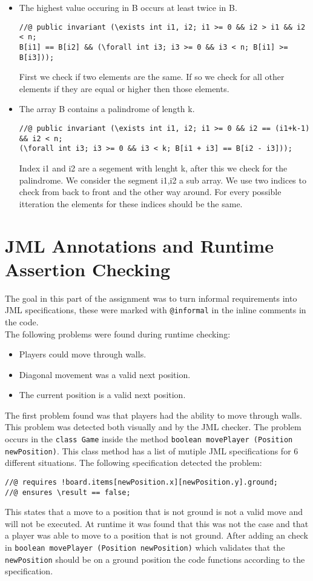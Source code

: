\documentclass[a4paper]{article}
\begin{document}
\begin{itemize}
	\item The highest value occuring in B occurs at least twice in B.
	\begin{lstlisting}
//@ public invariant (\exists int i1, i2; i1 >= 0 && i2 > i1 && i2 < n;
B[i1] == B[i2] && (\forall int i3; i3 >= 0 && i3 < n; B[i1] >= B[i3]));	
	\end{lstlisting}
	First we check if two elements are the same. If so we check for all other elements if they are equal or higher then those elements.
	
	\item The array B contains a palindrome of length k.
	\begin{lstlisting}
//@ public invariant (\exists int i1, i2; i1 >= 0 && i2 == (i1+k-1) && i2 < n;
(\forall int i3; i3 >= 0 && i3 < k; B[i1 + i3] == B[i2 - i3]));	
	\end{lstlisting}
	Index i1 and i2 are a segement with lenght k, after this we check for the palindrome. We consider the segment i1,i2 a sub array. We use two indices to check from back to front and the other way around. For every possible itteration the elements for these indices should be the same.
\end{itemize}

\section{JML Annotations and Runtime Assertion Checking}
The goal in this part of the assignment was to turn informal requirements into JML specifications, these were marked with \texttt{@informal} in the inline comments in the code. \\
The following problems were found during runtime checking:
\begin{itemize}
	\item Players could move through walls.
	\item Diagonal movement was a valid next position.
	\item The current position is a valid next position.
\end{itemize}
The first problem found was that players had the ability to move through walls. This problem was detected both visually and by the JML checker. The problem occurs in the \texttt{class Game} inside the method \texttt{boolean movePlayer (Position newPosition)}. This class method has a list of mutiple JML specifications for 6 different situations. The following specification detected the problem:
\begin{lstlisting}
//@ requires !board.items[newPosition.x][newPosition.y].ground;
//@ ensures \result == false;
\end{lstlisting}
This states that a move to a position that is not ground is not a valid move and will not be executed. At runtime it was found that this was not the case and that a player was able to move to a position that is not ground. After adding an check in \texttt{boolean movePlayer (Position newPosition)} which validates that the \texttt{newPosition} should be on a ground position the code functions according to the specification.
\end{document}

